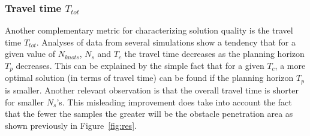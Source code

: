\documentclass[eprint]{actapoly}
\begin{document}
\subsubsection{Travel time $T_{tot}$}
%
Another complementary metric for characterizing solution quality is the travel time
$T_{tot}$. Analyses of data from several simulations show a tendency that for a given value 
of $N_{knots}$, $N_s$ and $T_c$ the travel time decreases as the planning horizon $T_p$ decreases.
This can be explained by the simple fact that for a given $T_c$, a more optimal solution (in terms of travel time) can be found if the planning horizon $T_p$ is smaller.
%        
Another relevant observation is that the overall travel time is shorter for smaller $N_s$'s. 
This misleading improvement does take into account the fact 
that the fewer the samples the greater will be the obstacle penetration area as shown previously in Figure~\ref{fig:res}.
\end{document}

